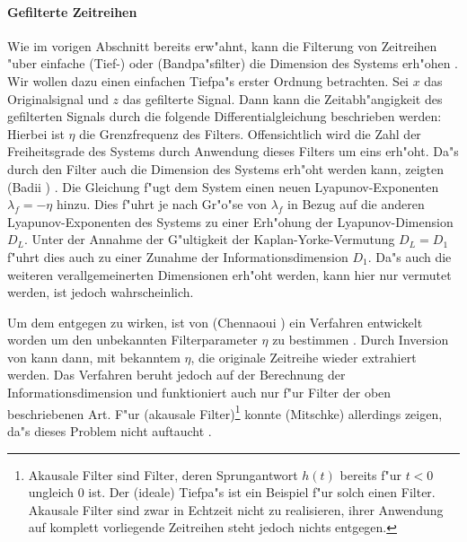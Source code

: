 \paragraph{Gefilterte Zeitreihen}
\label{chapcorrdimfiltered}
Wie im vorigen Abschnitt bereits erw"ahnt, kann die Filterung von Zeitreihen "uber einfache 
\begriff(Tief-) oder \begriff(Bandpa"sfilter) die Dimension des Systems erh"ohen \cite{Badii-politi}. Wir wollen dazu einen
einfachen Tiefpa"s erster Ordnung betrachten. Sei $x$ das Originalsignal und $z$ das
gefilterte Signal. Dann kann die Zeitabh"angigkeit des gefilterten Signals durch die
folgende Differentialgleichung beschrieben werden:
Hierbei ist $\eta$ die Grenzfrequenz des Filters. Offensichtlich wird die Zahl der
Freiheitsgrade des Systems durch Anwendung dieses Filters um eins erh"oht. Da"s durch den
Filter auch die Dimension des Systems erh"oht werden kann, zeigten \autor(Badii \etal) 
\cite{Badii-politi}. Die Gleichung f"ugt dem System einen neuen Lyapunov-Exponenten
$\lambda_f=-\eta$ hinzu. Dies f"uhrt je nach Gr"o"se von $\lambda_f$ in Bezug auf die
anderen Lyapunov-Exponenten des Systems zu einer Erh"ohung der Lyapunov-Dimension
$D_L$. Unter der Annahme der G"ultigkeit der  Kaplan-Yorke-Vermutung $D_L=D_1$ f"uhrt dies
auch zu einer Zunahme der Informationsdimension $D_1$. Da"s auch die weiteren
verallgemeinerten Dimensionen erh"oht werden, kann hier nur vermutet werden, ist jedoch
wahrscheinlich.

Um dem entgegen zu wirken, ist von \autor(Chennaoui \etal) ein Verfahren entwickelt worden 
um den unbekannten Filterparameter $\eta$ zu bestimmen \cite{Chennaoui}. Durch Inversion von
 kann dann, mit bekanntem $\eta$, die originale Zeitreihe wieder
extrahiert werden. Das Verfahren beruht jedoch auf der Berechnung der
Informationsdimension und funktioniert auch nur f"ur Filter der oben beschriebenen
Art. F"ur \begriff(akausale Filter)\footnote{Akausale Filter sind Filter, deren
Sprungantwort $h(t)$ bereits f"ur $t<0$ ungleich 0 ist. Der \begriff(ideale) Tiefpa"s
ist ein Beispiel f"ur solch einen Filter. Akausale Filter sind zwar in Echtzeit nicht zu
realisieren, ihrer Anwendung auf komplett vorliegende Zeitreihen steht jedoch nichts
entgegen.} konnte \autor(Mitschke)  allerdings zeigen, da"s dieses Problem nicht 
auftaucht \cite{Mitschke}.

